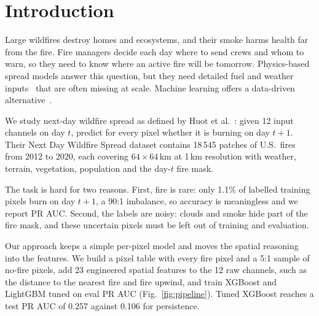 
\section{Introduction}
\label{sec:intro}

Large wildfires destroy homes and ecosystems, and their smoke harms health far from the fire.
Fire managers decide each day where to send crews and whom to warn, so they need to know where an
active fire will be tomorrow. Physics-based spread models answer this question, but they need
detailed fuel and weather inputs~\cite{andrews2018} that are often missing at scale. Machine learning offers a
data-driven alternative~\cite{jain2020}.

We study next-day wildfire spread as defined by Huot et al.~\cite{huot2022}: given 12 input
channels on day $t$, predict for every pixel whether it is burning on day $t+1$. Their Next Day
Wildfire Spread dataset contains 18\,545 patches of U.S.\ fires from 2012 to 2020, each covering
$64\times64$\,km at 1\,km resolution with weather, terrain, vegetation, population and the day-$t$
fire mask.

The task is hard for two reasons. First, fire is rare: only 1.1\% of labelled training pixels burn
on day $t+1$, a 90:1 imbalance, so accuracy is meaningless and we report PR AUC. Second, the
labels are noisy: clouds and smoke hide part of the fire mask, and these uncertain pixels must be
left out of training and evaluation.

Our approach keeps a simple per-pixel model and moves the spatial reasoning into the features. We
build a pixel table with every fire pixel and a 5:1 sample of no-fire pixels, add 23 engineered
spatial features to the 12 raw channels, such as the distance to the nearest fire and fire upwind,
and train XGBoost and LightGBM tuned on eval PR AUC (Fig.~\ref{fig:pipeline}). Tuned XGBoost
reaches a test PR AUC of 0.257 against 0.106 for persistence.

